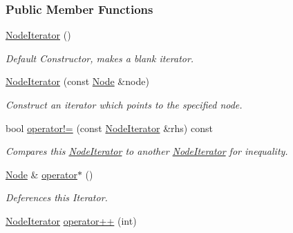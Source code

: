 \subsubsection*{Public Member Functions}
\begin{DoxyCompactItemize}
\item 
\hypertarget{classMezzanine_1_1xml_1_1NodeIterator_a818baf0e5bcf0f82eab280a42d6b0cdc}{
\hyperlink{classMezzanine_1_1xml_1_1NodeIterator_a818baf0e5bcf0f82eab280a42d6b0cdc}{NodeIterator} ()}
\label{classMezzanine_1_1xml_1_1NodeIterator_a818baf0e5bcf0f82eab280a42d6b0cdc}

\begin{DoxyCompactList}\small\item\em Default Constructor, makes a blank iterator. \item\end{DoxyCompactList}\item 
\hyperlink{classMezzanine_1_1xml_1_1NodeIterator_a0410f7dd525cb379c1b0d40efd857579}{NodeIterator} (const \hyperlink{classMezzanine_1_1xml_1_1Node}{Node} \&node)
\begin{DoxyCompactList}\small\item\em Construct an iterator which points to the specified node. \item\end{DoxyCompactList}\item 
bool \hyperlink{classMezzanine_1_1xml_1_1NodeIterator_ab1247c16d9c717907e96226bbba89e34}{operator!=} (const \hyperlink{classMezzanine_1_1xml_1_1NodeIterator}{NodeIterator} \&rhs) const 
\begin{DoxyCompactList}\small\item\em Compares this \hyperlink{classMezzanine_1_1xml_1_1NodeIterator}{NodeIterator} to another \hyperlink{classMezzanine_1_1xml_1_1NodeIterator}{NodeIterator} for inequality. \item\end{DoxyCompactList}\item 
\hyperlink{classMezzanine_1_1xml_1_1Node}{Node} \& \hyperlink{classMezzanine_1_1xml_1_1NodeIterator_a3536793e5b97f6ccf6c112929da94188}{operator$\ast$} ()
\begin{DoxyCompactList}\small\item\em Deferences this Iterator. \item\end{DoxyCompactList}\item 
\hyperlink{classMezzanine_1_1xml_1_1NodeIterator}{NodeIterator} \hyperlink{classMezzanine_1_1xml_1_1NodeIterator_a1f471eec23974b4ef4372c58b3ff1c8b}{operator++} (int)

\end{DoxyCompactItemize}
